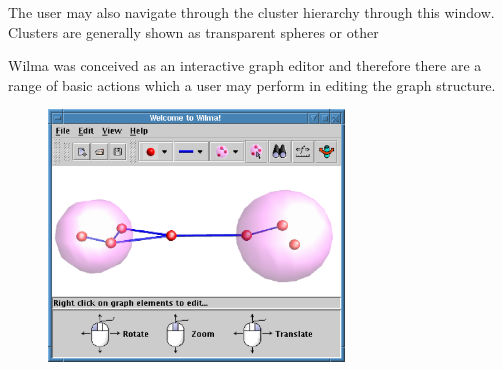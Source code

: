 \documentclass[runningheads]{cl2emult}
\begin{document}
The user may also navigate through the cluster hierarchy through this
window.  Clusters are generally shown as transparent spheres or other 

Wilma was conceived as an interactive graph editor and therefore there
are a range of basic actions which a user may perform in editing the
graph structure.
\begin{figure}[h]
  \centering
    \label{fig-controls}
    \includegraphics[width=0.7\textwidth]{figures/wilmacontrols.eps}
\end{figure}
\end{document}
